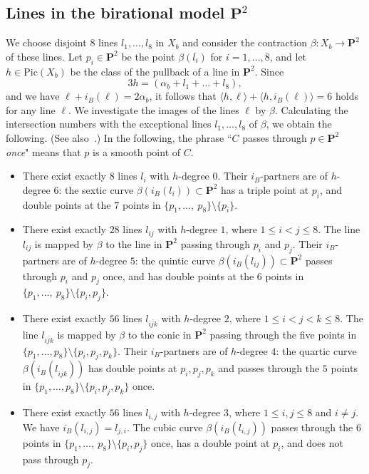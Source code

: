\documentclass{math}
\theoremstyle{plain}
\numberwithin{equation}{section}
\newcommand{\intf}[1]{\langle #1 \rangle}
\newcommand{\Pic}{\mathrm{Pic}}
\newcommand{\bfP}{\mathbf{P}}
\newcommand{\involB}{i_B}
\begin{document}
\subsection{Lines in the birational model \texorpdfstring{${\bfP}^{2}$}{bP2}}\label{subsec:linesinbP2}
%
We choose  disjoint $8$ lines $l_1, \dots, l_8$ in $X_b$
and consider the contraction 
$\beta\colon X_b\to {\bfP}^{2}$
of these lines.
Let $p_i\in {\bfP}^{2}$ be the point  $\beta(l_i)$ for $i=1, \dots, 8$,
and let $h\in \Pic(X_b)$ be the class of the pullback of a line in ${\bfP}^{2}$.
Since
 \[
 3h=(\alpha_b+l_1+ \dots+l_8),
\]
and we have $\ell+\involB(\ell)=2\alpha_b$, it follows that
$\intf{h, \ell}+\intf{h, \involB(\ell)}=6$ 
holds for any line $\ell$.
We investigate the images of the lines $\ell$ by $\beta$.
Calculating the intersection numbers with the exceptional lines $l_1, \dots, l_8$ of $\beta$,
we obtain the following.
(See also~\cite[Theorem~26.2]{Manin1986}.)
In the following, the phrase ``$C$ passes through $p\in {\bfP}^{2}$ \emph{once}"
means that $p$  is a smooth point of $C$. 
%
\begin{itemize}[itemsep=5pt]
%
\item There exist exactly $8$ lines $l_i$ with $h$-degree $0$. 
Their $\involB$-partners are of $h$-degree $6$:
the sextic curve  $\beta(\involB(l_i))\subset {\bfP}^{2}$  has a triple  point at $p_i$, 
and double points at the $7$ points in $\{p_1, \dots, \ p_8\}\setminus\{p_i\}$.
%
\item There exist exactly $28$ lines $l_{ij}$ with $h$-degree $1$,
where $1\le i<j\le 8$.
The line $l_{ij}$ is mapped by $\beta$ to the line  in ${\bfP}^{2}$ 
passing through  $p_i$ and $p_j$.
Their $\involB$-partners are  of   $h$-degree $5$:
the quintic curve  $\beta(\involB(l_{ij}))\subset {\bfP}^{2}$ passes through $p_i$ and $p_j$ once, 
and has  double points at the $6$ points  in 
$\{p_1, \dots, \ p_8\}\setminus\{p_i, p_j\}$.
%
\item There exist exactly $56$ lines $l_{\overline{ijk}}$ with $h$-degree $2$,
where $1\le i<j<k\le 8$.
The line $l_{\overline{ijk}}$  is  mapped by $\beta$ to the conic   in ${\bfP}^{2}$ 
passing through the five points 
in $\{p_1, \dots, p_8\}\setminus \{p_i, p_j, p_k\}$.
Their $\involB$-partners are  of $h$-degree $4$:
the quartic curve  $\beta(\involB(l_{\overline{ijk}}))$
has  double points at 
$p_i, p_j, p_k$ and 
 passes through the $5$ points  in $\{p_1, \dots, p_8\}\setminus \{p_i, p_j, p_k\}$ once.
%
\item There exist exactly $56$ lines $l_{i, j}$
with $h$-degree $3$,
where $1\le i, j\le 8$ and $i\ne j$.
We have $\involB(l_{i, j})=l_{j, i}$.
The cubic curve  $\beta(\involB(l_{i, j}))$
  passes through the $6$ points in 
$\{p_1, \dots, \ p_8\}\setminus\{p_i, p_j\}$ once, 
has a double point at $p_i$, and does not pass through $p_j$.
%
\end{itemize}
\end{document}
